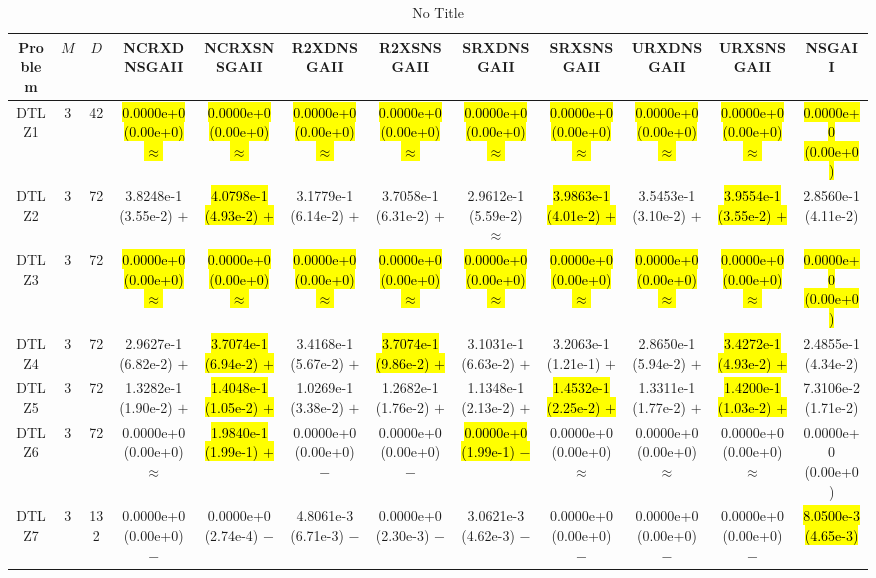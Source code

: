 \documentclass[journal]{IEEEtran}
\begin{document}
\begin{table*}[htbp]
\renewcommand{\arraystretch}{1.2}
\centering
\caption{No Title}
\begin{tabular}{cccccccccccc}
\toprule
Problem&$M$&$D$&NCRXDNSGAII&NCRXSNSGAII&R2XDNSGAII&R2XSNSGAII&SRXDNSGAII&SRXSNSGAII&URXDNSGAII&URXSNSGAII&NSGAII\\
\midrule
\multirow{1}{*}{DTLZ1}&3&42&\hl{0.0000e+0 (0.00e+0) $\approx$}&\hl{0.0000e+0 (0.00e+0) $\approx$}&\hl{0.0000e+0 (0.00e+0) $\approx$}&\hl{0.0000e+0 (0.00e+0) $\approx$}&\hl{0.0000e+0 (0.00e+0) $\approx$}&\hl{0.0000e+0 (0.00e+0) $\approx$}&\hl{0.0000e+0 (0.00e+0) $\approx$}&\hl{0.0000e+0 (0.00e+0) $\approx$}&\hl{0.0000e+0 (0.00e+0)}\\
\hline
\multirow{1}{*}{DTLZ2}&3&72&3.8248e-1 (3.55e-2) $+$&\hl{4.0798e-1 (4.93e-2) $+$}&3.1779e-1 (6.14e-2) $+$&3.7058e-1 (6.31e-2) $+$&2.9612e-1 (5.59e-2) $\approx$&\hl{3.9863e-1 (4.01e-2) $+$}&3.5453e-1 (3.10e-2) $+$&\hl{3.9554e-1 (3.55e-2) $+$}&2.8560e-1 (4.11e-2)\\
\hline
\multirow{1}{*}{DTLZ3}&3&72&\hl{0.0000e+0 (0.00e+0) $\approx$}&\hl{0.0000e+0 (0.00e+0) $\approx$}&\hl{0.0000e+0 (0.00e+0) $\approx$}&\hl{0.0000e+0 (0.00e+0) $\approx$}&\hl{0.0000e+0 (0.00e+0) $\approx$}&\hl{0.0000e+0 (0.00e+0) $\approx$}&\hl{0.0000e+0 (0.00e+0) $\approx$}&\hl{0.0000e+0 (0.00e+0) $\approx$}&\hl{0.0000e+0 (0.00e+0)}\\
\hline
\multirow{1}{*}{DTLZ4}&3&72&2.9627e-1 (6.82e-2) $+$&\hl{3.7074e-1 (6.94e-2) $+$}&3.4168e-1 (5.67e-2) $+$&\hl{3.7074e-1 (9.86e-2) $+$}&3.1031e-1 (6.63e-2) $+$&3.2063e-1 (1.21e-1) $+$&2.8650e-1 (5.94e-2) $+$&\hl{3.4272e-1 (4.93e-2) $+$}&2.4855e-1 (4.34e-2)\\
\hline
\multirow{1}{*}{DTLZ5}&3&72&1.3282e-1 (1.90e-2) $+$&\hl{1.4048e-1 (1.05e-2) $+$}&1.0269e-1 (3.38e-2) $+$&1.2682e-1 (1.76e-2) $+$&1.1348e-1 (2.13e-2) $+$&\hl{1.4532e-1 (2.25e-2) $+$}&1.3311e-1 (1.77e-2) $+$&\hl{1.4200e-1 (1.03e-2) $+$}&7.3106e-2 (1.71e-2)\\
\hline
\multirow{1}{*}{DTLZ6}&3&72&0.0000e+0 (0.00e+0) $\approx$&\hl{1.9840e-1 (1.99e-1) $+$}&0.0000e+0 (0.00e+0) $-$&0.0000e+0 (0.00e+0) $-$&\hl{0.0000e+0 (1.99e-1) $-$}&0.0000e+0 (0.00e+0) $\approx$&0.0000e+0 (0.00e+0) $\approx$&0.0000e+0 (0.00e+0) $\approx$&0.0000e+0 (0.00e+0)\\
\hline
\multirow{1}{*}{DTLZ7}&3&132&0.0000e+0 (0.00e+0) $-$&0.0000e+0 (2.74e-4) $-$&4.8061e-3 (6.71e-3) $-$&0.0000e+0 (2.30e-3) $-$&3.0621e-3 (4.62e-3) $-$&0.0000e+0 (0.00e+0) $-$&0.0000e+0 (0.00e+0) $-$&0.0000e+0 (0.00e+0) $-$&\hl{8.0500e-3 (4.65e-3)}\\

\end{tabular}
\end{table*}
\end{document}
